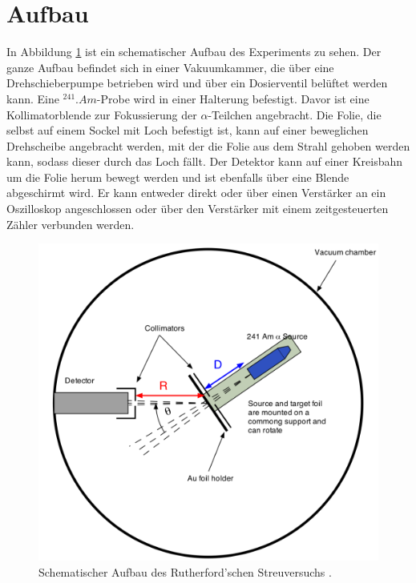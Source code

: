 \section{Aufbau}
\label{sec:Aufbau}

In Abbildung \ref{fig:Aufbau} ist ein schematischer Aufbau des Experiments zu sehen.
Der ganze Aufbau befindet sich in einer Vakuumkammer, die über eine Drehschieberpumpe betrieben wird und über ein Dosierventil belüftet werden kann.
Eine $^{241}.{Am}$-Probe wird in einer Halterung befestigt. Davor ist eine Kollimatorblende zur Fokussierung der $\alpha$-Teilchen angebracht.
Die Folie, die selbst auf einem Sockel mit Loch befestigt ist, kann auf einer beweglichen Drehscheibe angebracht werden, mit der die Folie aus dem Strahl gehoben werden kann, sodass dieser durch das Loch fällt.
Der Detektor kann auf einer Kreisbahn um die Folie herum bewegt werden und ist ebenfalls über eine Blende abgeschirmt wird.
Er kann entweder direkt oder über einen Verstärker an ein Oszilloskop angeschlossen oder über den Verstärker mit einem zeitgesteuerten Zähler verbunden werden.

\begin{figure}
\centering
\includegraphics[width=\linewidth-70pt,keepaspectratio]{content/images/Aufbau.pdf}
\caption{Schematischer Aufbau des Rutherford'schen Streuversuchs \cite{Aufbau16}.}
\label{fig:Aufbau}
\end{figure}

